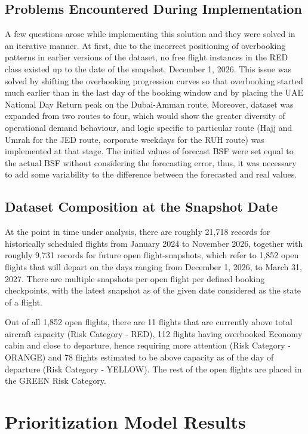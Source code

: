 \subsection{Problems Encountered During Implementation}

A few questions arose while implementing this solution and they were solved in an iterative manner. At first, due to the incorrect positioning of overbooking patterns in earlier versions of the dataset, no free flight instances in the RED class existed up to the date of the snapshot, December 1, 2026. This issue was solved by shifting the overbooking progression curves so that overbooking started much earlier than in the last day of the booking window and by placing the UAE National Day Return peak on the Dubai-Amman route. Moreover, dataset was expanded from two routes to four, which would show the greater diversity of operational demand behaviour, and logic specific to particular route (Hajj and Umrah for the JED route, corporate weekdays for the RUH route) was implemented at that stage. The initial values of forecast BSF were set equal to the actual BSF without considering the forecasting error, thus, it was necessary to add some variability to the difference between the forecasted and real values.

\subsection{Dataset Composition at the Snapshot Date}

At the point in time under analysis, there are roughly 21,718 records for historically scheduled flights from January 2024 to November 2026, together with roughly 9,731 records for future open flight-snapshots, which refer to 1,852 open flights that will depart on the days ranging from December 1, 2026, to March 31, 2027. There are multiple snapshots per open flight per defined booking checkpoints, with the latest snapshot as of the given date considered as the state of a flight.

Out of all 1,852 open flights, there are 11 flights that are currently above total aircraft capacity (Risk Category - RED), 112 flights having overbooked Economy cabin and close to departure, hence requiring more attention (Risk Category - ORANGE) and 78 flights estimated to be above capacity as of the day of departure (Risk Category - YELLOW). The rest of the open flights are placed in the GREEN Risk Category.

\section{Prioritization Model Results}

